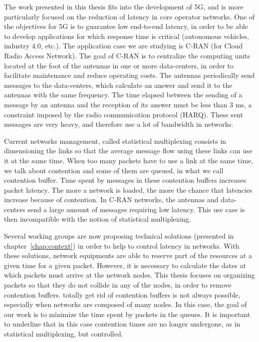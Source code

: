 The work presented in this thesis fits into the development of 5G, and is more particularly focused on the reduction of latency in core operator networks.
One of the objectives for 5G is to guarantee low end-to-end latency, in order to be able to develop applications for which response time is critical (autonomous vehicles, industry 4.0, etc.).
The application case we are studying is C-RAN (for Cloud Radio Access Network). The goal of C-RAN is to centralize the computing units located at the foot of the antennas in one or more data-centers, in order to facilitate maintenance and reduce operating costs. The antennas periodically send messages to the data-centers, which calculate an answer and send it to the antennas with the same frequency. The time elapsed between the sending of a message by an antenna and the reception of its answer must be less than $3$ ms, a constraint imposed by the radio communication protocol (HARQ). These sent messages are very heavy, and therefore use a lot of bandwidth in networks.

Current networks management, called statistical multiplexing consists in dimensioning the links so that the average message flow using these links can use it at the same time. When too many packets have to use a link at the same time, we talk about contention and some of them are queued, in what we call contention buffer. Time spent by messages in these contention buffers increases packet latency. The more a network is loaded, the more the chance that latencies increase because of contention. In C-RAN networks, the antennas and data-centers send a large amount of messages requiring low latency. This use case is then incompatible with the notion of statistical multiplexing.

Several working groups are now proposing technical solutions (presented in chapter~\ref{chap:context}) in order to help to control latency in networks. With these solutions, network equipments are able to reserve part of the resources at a given time for a given packet. However, it is necessary to calculate the dates at which packets must arrive at the network nodes. This thesis focuses on organizing packets so that they do not collide in any of the nodes, in order to remove contention buffers. totally get rid of contention buffers is not always possible, especially when networks are composed of many nodes. In this case, the goal of our work is to minimize the time spent by packets in the queues. It is important to underline that in this case contention times are no longer undergone, as in statistical multiplexing, but controlled.

